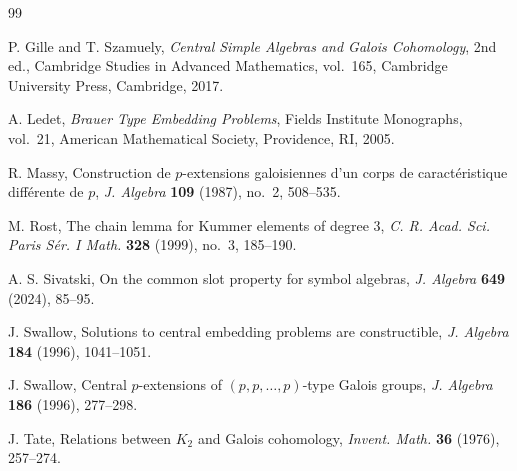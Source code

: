 \documentclass[12pt]{amsart}
\theoremstyle{definition}
\theoremstyle{remark}
\newcommand{\Hp}{H_{p^3}}
\begin{document}



\begin{thebibliography}{99}

P. Gille and T. Szamuely,
\emph{Central Simple Algebras and Galois Cohomology},
2nd ed., Cambridge Studies in Advanced Mathematics, vol.~165,
Cambridge University Press, Cambridge, 2017.

A. Ledet,
\emph{Brauer Type Embedding Problems},
Fields Institute Monographs, vol.~21,
American Mathematical Society, Providence, RI, 2005.

R. Massy,
Construction de $p$-extensions galoisiennes d'un corps de
caract\'eristique diff\'erente de $p$,
\emph{J. Algebra} \textbf{109} (1987), no.~2, 508--535.

M. Rost,
The chain lemma for Kummer elements of degree $3$,
\emph{C. R. Acad. Sci. Paris S\'er. I Math.} \textbf{328} (1999), no.~3,
185--190.

A. S. Sivatski,
On the common slot property for symbol algebras,
\emph{J. Algebra} \textbf{649} (2024), 85--95.

J. Swallow,
Solutions to central embedding problems are constructible,
\emph{J. Algebra} \textbf{184} (1996), 1041--1051.

J. Swallow,
Central $p$-extensions of $(p,p,\ldots,p)$-type Galois groups,
\emph{J. Algebra} \textbf{186} (1996), 277--298.

J. Tate,
Relations between $K_2$ and Galois cohomology,
\emph{Invent. Math.} \textbf{36} (1976), 257--274.

\end{thebibliography}
\end{document}
